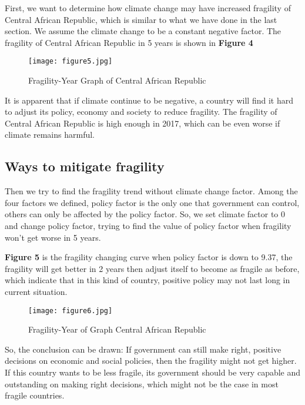 \documentclass{mcmthesis}
\begin{document}
	First, we want to determine how climate change may have increased fragility of Central African Republic, which is similar to what we have done in the last section. We assume the climate change to be a constant negative factor. The fragility of Central African Republic in 5 years is shown in \textbf{Figure 4}
	
	\begin{figure}[h]
		\small
		\centering
		\texttt{[image: figure5.jpg]}
		\caption{Fragility-Year Graph of Central African Republic} \label{fig:Fragility-Year Central African Republic}
	\end{figure}
	
	It is apparent that if climate continue to be negative, a country will find it hard to adjust its policy, economy and society to reduce fragility. The fragility of Central African Republic is high enough in 2017, which can be even worse if climate remains harmful.


	\subsection{Ways to mitigate fragility}
	Then we try to find the fragility trend without climate change factor. Among the four factors we defined, policy factor is the only one that government can control, others can only be affected by the policy factor. So, we set climate factor to 0 and change policy factor, trying to find the value of policy factor when fragility won’t get worse in 5 years.
	
	\textbf{Figure 5} is the fragility changing curve when policy factor is down to 9.37, the fragility will get better in 2 years then adjust itself to become as fragile as before, which indicate that in this kind of country, positive policy may not last long in current situation.
	
	\begin{figure}[h]
		\small
		\centering
		\texttt{[image: figure6.jpg]}
		\caption{Fragility-Year of Graph Central African Republic} \label{fig:Fragility-Year Central African Republic}
	\end{figure}
	
	So, the conclusion can be drawn: If government can still make right, positive decisions on economic and social policies, then the fragility might not get higher. If this country wants to be less fragile, its government should be very capable and outstanding on making right decisions, which might not be the case in most fragile countries.
\end{document}
